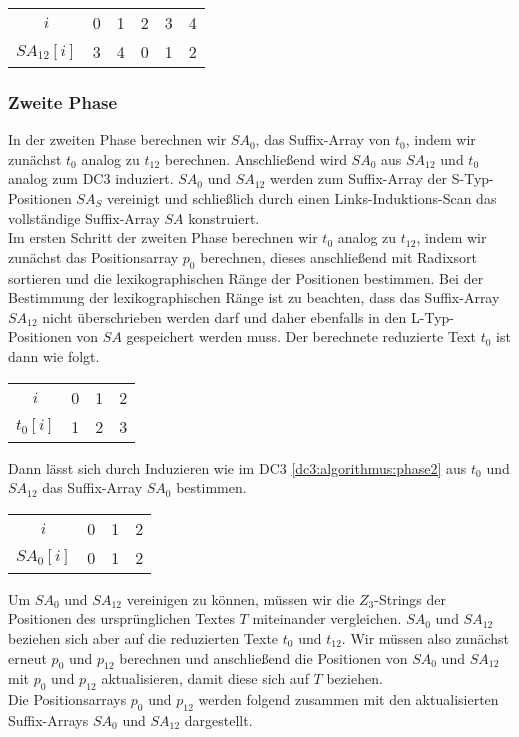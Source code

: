 \begin{table}[H]
	\footnotesize
	\centering
	\begin{tabular}{c| c c c c c }
		$i$ & 0 & 1 & 2 & 3 & 4 \\
		$SA_{12}[i]$ & 3 & 4 & 0 & 1 & 2 
	\end{tabular}
\end{table}

\subsubsection{Zweite Phase}

In der zweiten Phase berechnen wir $SA_0$, das Suffix-Array von $t_0$, indem wir zunächst $t_0$ analog zu $t_{12}$ berechnen. Anschließend wird $SA_0$ aus $SA_{12}$ und $t_0$ analog zum DC3 induziert. $SA_0$ und $SA_{12}$ werden zum Suffix-Array der S-Typ-Positionen $SA_S$ vereinigt und schließlich durch einen Links-Induktions-Scan das vollständige Suffix-Array $SA$ konstruiert. \\
Im ersten Schritt der zweiten Phase berechnen wir $t_0$ analog zu $t_{12}$, indem wir zunächst das Positionsarray $p_0$ berechnen, dieses anschließend mit Radixsort sortieren und die lexikographischen Ränge der Positionen bestimmen. Bei der Bestimmung der lexikographischen Ränge ist zu beachten, dass das Suffix-Array $SA_{12}$ nicht überschrieben werden darf und daher ebenfalls in den L-Typ-Positionen von $SA$ gespeichert werden muss. Der berechnete reduzierte Text $t_0$ ist dann wie folgt.

\begin{table}[H]
	\footnotesize
	\centering
	\begin{tabular}{c| c c c }
		$i$ & 0 & 1 & 2 \\
		$t_0[i]$ & 1 & 2 & 3 
	\end{tabular}
\end{table}

Dann lässt sich durch Induzieren wie im DC3 \cref{dc3:algorithmus:phase2} aus $t_0$ und $SA_{12}$ das Suffix-Array $SA_0$ bestimmen.

\begin{table}[H]
	\footnotesize
	\centering
	\begin{tabular}{c| c c c }
		$i$ & 0 & 1 & 2 \\
		$SA_0[i]$ & 0 & 1 & 2 
	\end{tabular}
\end{table}

Um $SA_0$ und $SA_{12}$ vereinigen zu können, müssen wir die $Z_3$-Strings der Positionen des ursprünglichen Textes $T$ miteinander vergleichen. $SA_0$ und $SA_{12}$ beziehen sich aber auf die reduzierten Texte $t_0$ und $t_{12}$. Wir müssen also zunächst erneut $p_0$ und $p_{12}$ berechnen und anschließend die Positionen von $SA_0$ und $SA_{12}$ mit $p_0$ und $p_{12}$ aktualisieren, damit diese sich auf $T$ beziehen. \\
Die Positionsarrays $p_0$ und $p_{12}$ werden folgend zusammen mit den aktualisierten Suffix-Arrays $SA_0$ und $SA_{12}$ dargestellt. 

